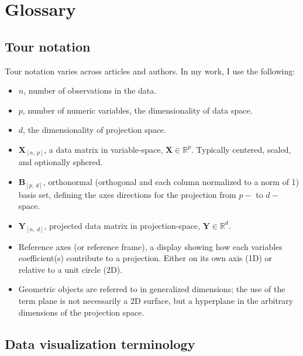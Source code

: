 \documentclass{monashthesis}
\begin{document}
\hypertarget{ch:glossary}{%
\chapter{Glossary}\label{ch:glossary}}

\hypertarget{sec:tour_notation}{%
\section{Tour notation}\label{sec:tour_notation}}

Tour notation varies across articles and authors. In my work, I use the following:

\begin{itemize}
\tightlist
\item
  \(n\), number of observations in the data.
\item
  \(p\), number of numeric variables, the dimensionality of data space.
\item
  \(d\), the dimensionality of projection space.
\item
  \(\textbf{X}_{[n,~p]}\), a data matrix in variable-space, \(\textbf{X} \in \mathbb{R}^{p}\). Typically centered, scaled, and optionally sphered.
\item
  \(\textbf{B}_{[p,~d]}\), orthonormal (orthogonal and each column normalized to a norm of 1) basis set, defining the axes directions for the projection from \(p-\) to \(d-\)space.
\item
  \(\textbf{Y}_{[n,~d]}\), projected data matrix in projection-space, \(\textbf{Y} \in \mathbb{R}^{d}\).
\item
  Reference axes (or reference frame), a display showing how each variables coefficient(s) contribute to a projection. Either on its own axis (1D) or relative to a unit circle (2D).
\item
  Geometric objects are referred to in generalized dimensions; the use of the term plane is not necessarily a 2D surface, but a hyperplane in the arbitrary dimensions of the projection space.
\end{itemize}

\hypertarget{sec:3d-terminology}{%
\section{Data visualization terminology}\label{sec:3d-terminology}}
\end{document}

